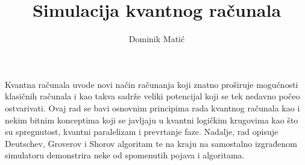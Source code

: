 \documentclass[times, utf8, zavrsni, numeric]{fer}
\begin{document}

\title{Simulacija kvantnog računala}

\author{Dominik Matić}



\zahvala{}

\tableofcontents
 














\begin{sazetak}
Kvantna računala uvode novi način računanja koji znatno proširuje mogućnosti klasičnih računala i kao takva sadrže veliki potencijal koji se tek nedavno počeo ostvarivati. Ovaj rad se bavi osnovnim principima rada kvantnog računala kao i nekim bitnim konceptima koji se javljaju u kvantni logičkim krugovima kao što su spregnutost, kvantni paralelizam i prevrtanje faze. Nadalje, rad opisuje Deutschev, Groverov i Shorov algoritam te na kraju na samostalno izgrađenom simulatoru demonstrira neke od spomenutih pojava i algoritama.

\end{sazetak}
\end{document}
